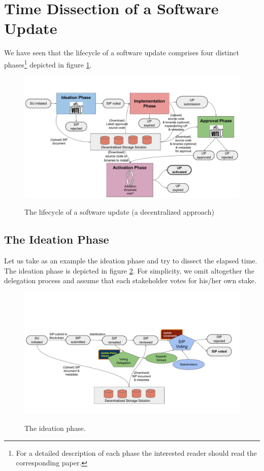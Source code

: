 \section{Time Dissection of a Software Update}
We have seen that the lifecycle of a software update comprises four distinct phases\footnote{For a detailed description of each phase the interested reader should read the corresponding paper.} depicted in figure \ref{lifecycle}.

\begin{figure}[h!]
    \caption{The lifecycle of a software update (a decentralized approach)}
    \centering
    \includegraphics[width=\textwidth]{figures/lifecycle_phases.pdf}
    \label{lifecycle}
\end{figure}


\subsection{The Ideation Phase}
Let us take as an example the ideation phase and try to dissect the elapsed time. The ideation phase is depicted in figure \ref{ideation}. For simplicity, we omit altogether the delegation process and assume that each stakeholder votes for his/her own stake.

\begin{figure}[h!]
    \caption{The ideation phase.}
    \centering
    \includegraphics[width=1.0 \columnwidth,keepaspectratio]{figures/ideation_phase.pdf}
    \label{ideation}
\end{figure}

